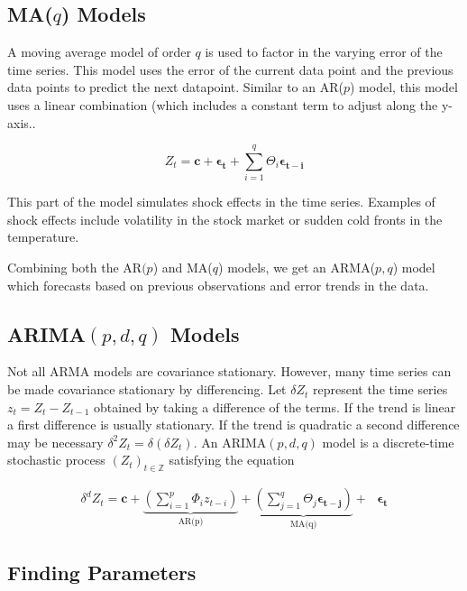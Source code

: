 \subsection*{MA($q$) Models} 

A moving average model of order $q$ is used to factor in the varying error of the time series.
This model uses the error of the current data point and the previous data points to predict the next datapoint.
Similar to an AR($p$) model, this model uses a linear combination (which includes a constant term to adjust along the y-axis..

\begin{equation}
Z_t = \mathbf{c} + \boldsymbol{\epsilon_t} + \sum_{i=1}^q\Theta_i\boldsymbol{\epsilon_{t-i}}
\label{eq:MA}
\end{equation}

This part of the model simulates shock effects in the time series.
Examples of shock effects include volatility in the stock market or sudden cold fronts in the temperature.

Combining both the AR$(p$) and MA($q$) models, we get an ARMA($p,q$) model which forecasts based on previous observations and error trends in the data.

\subsection*{ARIMA$(p,d,q)$ Models}

Not all ARMA models are covariance stationary. 
However, many time series can be made covariance stationary by differencing.
Let $\delta Z_t$ represent the time series $z_t = Z_t - Z_{t-1}$ obtained by taking a difference of the terms. 
If the trend is linear a first difference is usually stationary.
If the trend is quadratic a second difference may be necessary $\delta ^2 Z_t = \delta ( \delta Z_t)$.
An $\text{ARIMA}(p,d,q)$ model is a discrete-time stochastic process $(Z_t)_{t \in \mathbb{Z}}$ satisfying the equation

\begin{align}
    \label{eq:arima:def}
    \delta ^ d Z_t = \mathbf{c} + \underbrace{\left(\sum_{i=1}^p \Phi_{i}z_{t - i}\right)}_\text{AR(p)} +  
    \underbrace{\left(\sum_{j=1}^{q} \Theta_{j}\boldsymbol{\epsilon_{t-j}} \right)}_\text{MA(q)} + \text{ } \boldsymbol{\epsilon_t}
\end{align}


\subsection*{Finding Parameters}

